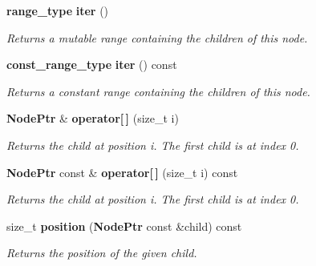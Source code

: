 \begin{CompactItemize}
\item 
{\bf range\_\-type} {\bf iter} ()\label{structsprite_1_1Node_a7}

\begin{CompactList}\small\item\em Returns a mutable range containing the children of this node. \item\end{CompactList}\item 
{\bf const\_\-range\_\-type} {\bf iter} () const \label{structsprite_1_1Node_a8}

\begin{CompactList}\small\item\em Returns a constant range containing the children of this node. \item\end{CompactList}\item 
{\bf Node\-Ptr} \& {\bf operator[$\,$]} (size\_\-t i)\label{structsprite_1_1Node_a9}

\begin{CompactList}\small\item\em Returns the child at position i. The first child is at index 0. \item\end{CompactList}\item 
{\bf Node\-Ptr} const \& {\bf operator[$\,$]} (size\_\-t i) const \label{structsprite_1_1Node_a10}

\begin{CompactList}\small\item\em Returns the child at position i. The first child is at index 0. \item\end{CompactList}\item 
size\_\-t {\bf position} ({\bf Node\-Ptr} const \&child) const 
\begin{CompactList}\small\item\em Returns the position of the given child. \item\end{CompactList}\end{CompactItemize}
